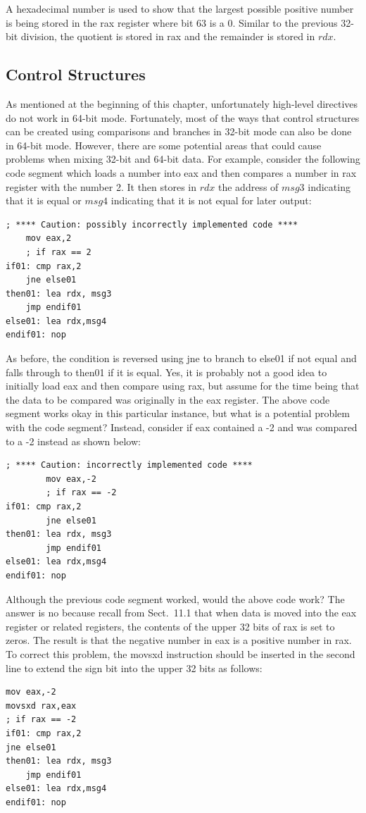 \documentclass[10pt]{book}
\begin{document}
A hexadecimal number is used to show that the largest possible positive number is being stored in the rax register where bit 63 is a 0. Similar to the previous 32-bit division, the quotient is stored in rax and the remainder is stored in $rdx$.

\subsection{Control Structures}
As mentioned at the beginning of this chapter, unfortunately high-level directives do not work in 64-bit mode. Fortunately, most of the ways that control structures can be created using comparisons and branches in 32-bit mode can also be done in 64-bit mode. However, there are some potential areas that could cause problems when mixing 32-bit and 64-bit data. For example, consider the following code segment which loads a number into eax and then compares a number in rax register with the number 2. It then stores in $rdx$ the address of $msg3$ indicating that it is equal or $msg4$ indicating that it is not equal for later output:

\begin{verbatim}
; **** Caution: possibly incorrectly implemented code ****
    mov eax,2
    ; if rax == 2
if01: cmp rax,2
    jne else01
then01: lea rdx, msg3
    jmp endif01
else01: lea rdx,msg4
endif01: nop
\end{verbatim}

As before, the condition is reversed using jne to branch to else01 if not equal and falls through to then01 if it is equal. Yes, it is probably not a good idea to initially load eax and then compare using rax, but assume for the time being that the data to be compared was originally in the eax register. The above code segment works okay in this particular instance, but what is a potential problem with the code segment? Instead, consider if eax contained a -2 and was compared to a -2 instead as shown below:

\begin{verbatim}
; **** Caution: incorrectly implemented code ****
        mov eax,-2
        ; if rax == -2
if01: cmp rax,2
        jne else01
then01: lea rdx, msg3
        jmp endif01
else01: lea rdx,msg4
endif01: nop
\end{verbatim}

Although the previous code segment worked, would the above code work? The answer is no because recall from Sect.~11.1 that when data is moved into the eax register or related registers, the contents of the upper 32 bits of rax is set to zeros. The result is that the negative number in eax is a positive number in rax. To correct this problem, the movsxd instruction should be inserted in the second line to extend the sign bit into the upper 32 bits as follows:
\begin{verbatim}
mov eax,-2
movsxd rax,eax
; if rax == -2
if01: cmp rax,2
jne else01
then01: lea rdx, msg3
    jmp endif01
else01: lea rdx,msg4
endif01: nop
\end{verbatim}
\end{document}
